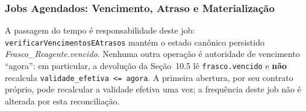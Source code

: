 \subsubsection{Jobs Agendados: Vencimento, Atraso e Materialização}

\begin{regra}
A passagem do tempo é responsabilidade deste job: \texttt{verificarVencimentosEAtrasos} mantém o estado canônico persistido \textit{Frasco\_Reagente.vencido}. Nenhuma outra operação é autoridade de vencimento ``agora'': em particular, a devolução da Seção~10.5 lê \texttt{frasco.vencido} e \textbf{não} recalcula \texttt{validade\_efetiva <= agora}. A primeira abertura, por seu contrato próprio, pode recalcular a validade efetiva uma vez; a frequência deste job não é alterada por esta reconciliação.
\end{regra}

